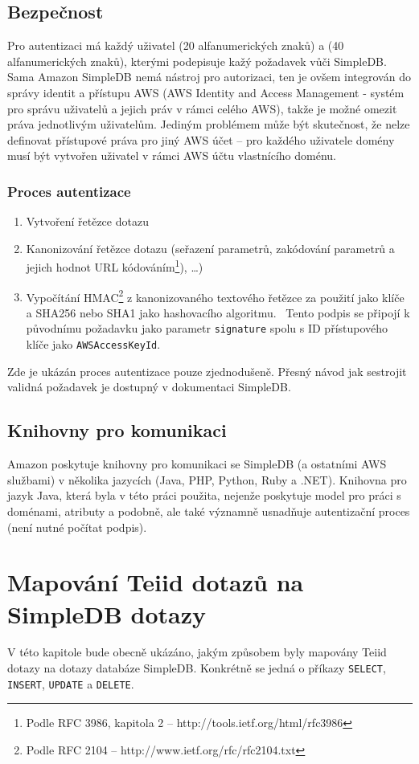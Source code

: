 \documentclass[oneside,12pt,final]{fithesis2}
\begin{document}
\section{Bezpečnost}
Pro autentizaci má každý uživatel  (20 alfanumerických znaků) a  (40 alfanumerických znaků), kterými podepisuje kažý požadavek vůči SimpleDB. Sama Amazon SimpleDB nemá nástroj pro autorizaci, ten je ovšem integrován do správy identit a přístupu AWS (AWS Identity and Access Management - systém pro správu uživatelů a jejich práv v rámci celého AWS), takže je možné omezit práva jednotlivým uživatelům. Jediným problémem může být skutečnost, že nelze definovat přístupové práva pro jiný AWS účet -- pro každého uživatele domény musí být vytvořen uživatel v rámci AWS účtu vlastnícího doménu.

\subsection{Proces autentizace}
\begin{enumerate}
 \item Vytvoření řetězce dotazu
 \item Kanonizování řetězce dotazu (seřazení parametrů, zakódování parametrů a jejich hodnot URL kódováním\footnote{Podle RFC 3986, kapitola 2 -- http://tools.ietf.org/html/rfc3986}), \dots)
 \item Vypočítání HMAC\footnote{Podle RFC 2104 -- http://www.ietf.org/rfc/rfc2104.txt} z kanonizovaného textového řetězce za použití  jako klíče a SHA256 nebo SHA1 jako hashovacího algoritmu.
 \ Tento podpis se připojí k původnímu požadavku jako parametr \verb<signature< spolu s ID přístupového klíče jako \verb<AWSAccessKeyId<.
\end{enumerate}
Zde je ukázán proces autentizace pouze zjednodušeně. Přesný návod jak sestrojit validná požadavek je dostupný v dokumentaci SimpleDB.

\section{Knihovny pro komunikaci}
Amazon poskytuje knihovny pro komunikaci se SimpleDB (a ostatními AWS službami) v několika jazycích (Java, PHP, Python, Ruby a .NET). 
Knihovna pro jazyk Java, která byla v této práci použita, nejenže poskytuje model pro práci s doménami, atributy a podobně, ale také významně usnadňuje autentizační proces (není nutné  počítat podpis).
\chapter{Mapování Teiid dotazů na SimpleDB dotazy}
V této kapitole bude obecně ukázáno, jakým způsobem byly mapovány Teiid dotazy na dotazy databáze SimpleDB. Konkrétně se jedná o příkazy \verb<SELECT<, \verb<INSERT<, \verb<UPDATE< a \verb<DELETE<.
\end{document}
